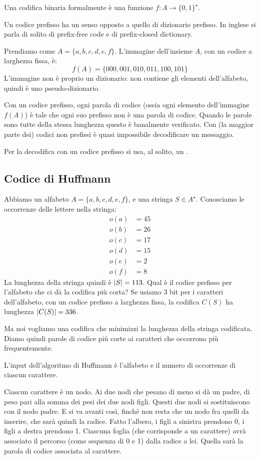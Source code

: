 Una codifica binaria formalmente \`e una funzione $f : A \to \{ 0, 1 \}^{\star}$.

Un codice prefisso ha un senso opposto a quello di dizionario prefisso. In inglese si parla di solito di prefix-free code e di prefix-closed dictionary.

Prendiamo come $A = \{ a, b, c, d, e, f \}$. L'immagine dell'insieme $A$, con un codice a larghezza fissa, \`e:
\[
f(A) = \{ 000, 001, 010, 011, 100, 101 \}
\]
L'immagine non \`e proprio un dizionario: non contiene gli elementi dell'alfabeto, quindi \`e uno pseudo-dizionario.

Con un codice prefisso, ogni parola di codice (ossia ogni elemento dell'immagine $f(A)$) \`e tale che ogni suo prefisso non \`e una parola di codice. Quando le parole sono tutte della stessa lunghezza questo \`e banalmente verificato. Con (la maggior parte dei) codici non prefissi \`e quasi impossibile decodificare un messaggio.

Per la decodifica con un codice prefisso si usa, al solito, un .

\subsection{Codice di Huffmann}

Abbiamo un alfabeto $A = \{ a, b, c, d, e, f \}$, e una stringa $S \in A^{\star}$. Conosciamo le occorrenze delle lettere nella stringa:
\begin{align*}
o(a) &= 45 \\
o(b) &= 26 \\
o(c) &= 17 \\
o(d) &= 15 \\
o(e) &= 2 \\
o(f) &= 8
\end{align*}
La lunghezza della stringa quindi \`e $\left\lvert{S}\right\rvert = 113$. Qual \`e il codice prefisso per l'alfabeto che ci d\`a la codifica pi\`u corta? Se usiamo 3 bit per i caratteri dell'alfabeto, con un codice prefisso a larghezza fissa, la codifica $C(S)$ ha lunghezza $\left\lvert{C(S)}\right\rvert = 336$.

Ma noi vogliamo una codifica che minimizzi la lunghezza della stringa codificata. Diamo quindi parole di codice pi\`u corte ai caratteri che occorrono pi\`u frequentemente.

L'input dell'algoritmo di Huffmann \`e l'alfabeto e il numero di occorrenze di ciascun carattere.

Ciascun carattere \`e un nodo. Ai due nodi che pesano di meno si d\`a un padre, di peso pari alla somma dei pesi dei due nodi figli. Questi due nodi si sostituiscono con il nodo padre. E si va avanti cos\`i, finch\'e non resta che un nodo fra quelli da inserire, che sar\`a quindi la radice. Fatto l'albero, i figli a sinistra prendono 0, i figli a destra prendono 1. Ciascuna foglia (che corrisponde a un carattere) avr\`a associato il percorso (come sequenza di 0 e 1) dalla radice a lei. Quella sar\`a la parola di codice associata al carattere.

